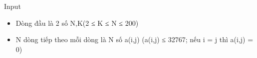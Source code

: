 Input
\begin{itemize}
	\item     Dòng đầu là 2 số N,K(2 ≤ K ≤ N ≤ 200)   
	\item     N dòng tiếp theo mỗi dòng là N số a(i,j) (a(i,j) ≤ 32767; nếu i = j thì a(i,j) = 0)   
\end{itemize}
